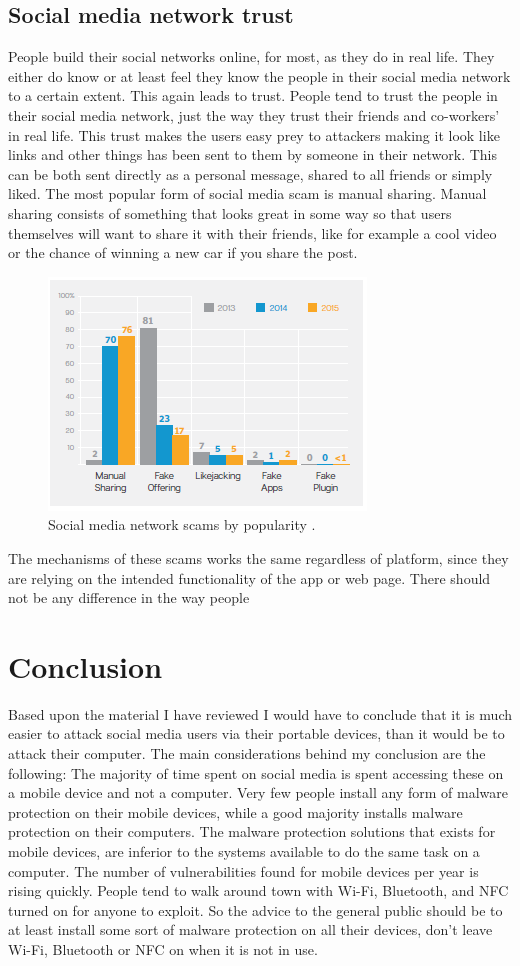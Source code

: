\subsection{Social media network trust}
People build their social networks online, for most, as they do in real life. They either do know or at least feel they know the people in their social media network to a certain extent. This again leads to trust. People tend to trust the people in their social media network, just the way they trust their friends and co-workers’ in real life.
This trust makes the users easy prey to attackers making it look like links and other things has been sent to them by someone in their network. This can be both sent directly as a personal message, shared to all friends or simply liked. The most popular form of social media scam is manual sharing. Manual sharing consists of something that looks great in some way so that users themselves will want to share it with their friends, like for example a cool video or the chance of winning a new car if you share the post.
\begin{figure}
\centering
\includegraphics[width=0.5 \textwidth]{fig/social_media_scams}
\caption{Social media network scams by popularity \cite{ISTR2016}.\label{fig:social_media_scams}}
\end{figure}
The mechanisms of these scams works the same regardless of platform, since they are relying on the intended functionality of the app or web page. There should not be any difference in the way people
\section{Conclusion}
Based upon the material I have reviewed I would have to conclude that it is much easier to attack social media users via their portable devices, than it would be to attack their computer. The main considerations behind my conclusion are the following: The majority of time spent on social media is spent accessing these on a mobile device and not a computer. Very few people install any form of malware protection on their mobile devices, while a good majority installs malware protection on their computers. The malware protection solutions that exists for mobile devices, are inferior to the systems available to do the same task on a computer. The number of vulnerabilities found for mobile devices per year is rising quickly. People tend to walk around town with Wi-Fi, Bluetooth, and NFC turned on for anyone to exploit.
So the advice to the general public should be to at least install some sort of malware protection on all their devices, don’t leave Wi-Fi, Bluetooth or NFC on when it is not in use.
